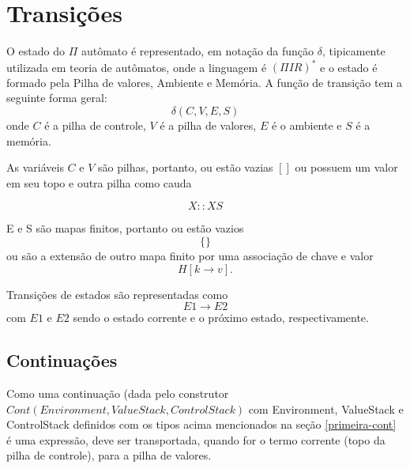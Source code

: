 \section{Transições}


O estado do $\Pi$ autômato é representado, em notação da função $\delta$, tipicamente utilizada em teoria de autômatos, onde a linguagem é $(\Pi \mathit{IR})^*$ e o estado é formado pela Pilha de valores, Ambiente e Memória. A função de transição tem a seguinte forma geral: 
$$
\delta(C, V, E, S)
$$ onde $C$ é a pilha de controle, $V$ é a pilha de valores, $E$ é o ambiente e $S$ é a memória.

As variáveis $C$ e $V$ são pilhas, portanto, ou estão vazias $[]$ ou possuem um valor em seu topo e outra pilha como cauda

$$X :: XS$$

E e S são mapas finitos, portanto ou estão vazios $$\{\}$$ ou são a extensão de outro mapa finito por uma associação de chave e valor $$H[k\rightarrow{}v].$$

Transições de estados são representadas como $$E1 \rightarrow{} E2$$ com $E1$ e $E2$ sendo o estado corrente e o próximo estado, respectivamente.



\subsection{\textbf{Continuações}}


Como uma continuação (dada pelo construtor $Cont(Environment,ValueStack,ControlStack)$ com Environment, ValueStack e ControlStack definidos com os tipos acima mencionados na seção \ref{primeira-cont} é uma expressão, deve ser transportada, quando for o termo corrente (topo da pilha de controle), para a pilha de valores.

